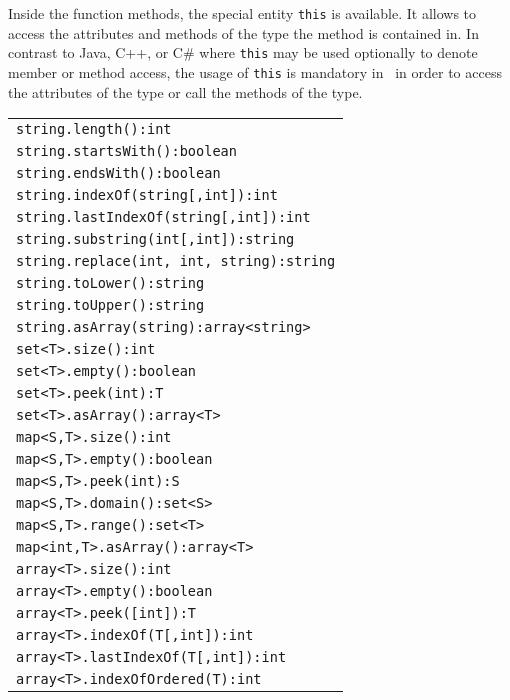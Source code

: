 Inside the function methods, the special entity \texttt{this} is available.
It allows to access the attributes and methods of the type the method is contained in.
In contrast to Java, C++, or C\# where \texttt{this} may be used optionally to denote member or method access,
the usage of \texttt{this} is mandatory in \GrG~in order to access the attributes of the type or call the methods of the type.

\begin{table}[htbp]
\centering
\begin{tabular}{|l|}
\hline
\texttt{string.length():int}\\
\texttt{string.startsWith():boolean}\\
\texttt{string.endsWith():boolean}\\
\texttt{string.indexOf(string[,int]):int}\\
\texttt{string.lastIndexOf(string[,int]):int}\\
\texttt{string.substring(int[,int]):string}\\
\texttt{string.replace(int, int, string):string}\\
\texttt{string.toLower():string}\\
\texttt{string.toUpper():string}\\
\texttt{string.asArray(string):array<string>}\\
\hline
\texttt{set<T>.size():int}\\
\texttt{set<T>.empty():boolean}\\
\texttt{set<T>.peek(int):T}\\
\texttt{set<T>.asArray():array<T>}\\
\hline
\texttt{map<S,T>.size():int}\\
\texttt{map<S,T>.empty():boolean}\\
\texttt{map<S,T>.peek(int):S}\\
\texttt{map<S,T>.domain():set<S>}\\
\texttt{map<S,T>.range():set<T>}\\
\texttt{map<int,T>.asArray():array<T>}\\
\hline
\texttt{array<T>.size():int}\\
\texttt{array<T>.empty():boolean}\\
\texttt{array<T>.peek([int]):T}\\
\texttt{array<T>.indexOf(T[,int]):int}\\
\texttt{array<T>.lastIndexOf(T[,int]):int}\\
\texttt{array<T>.indexOfOrdered(T):int}\\

\end{tabular}
\end{table}
